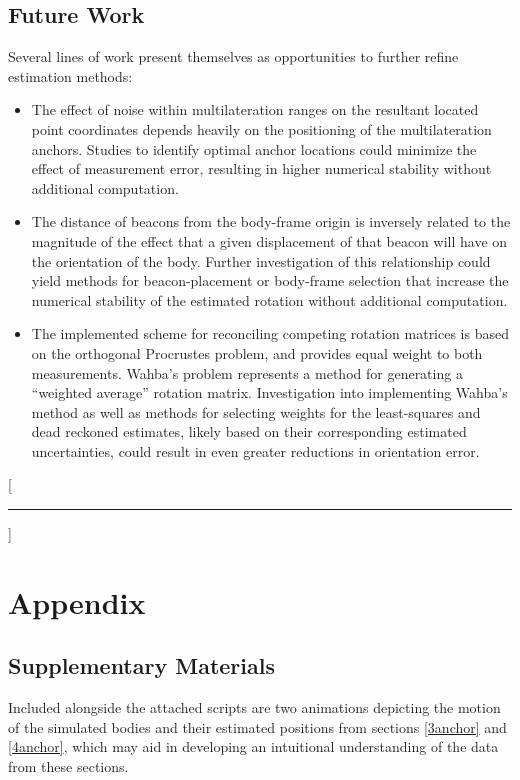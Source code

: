 \documentclass{report}
\begin{document}
		\section{Future Work}
			Several lines of work present themselves as opportunities to further refine estimation methods:
			\begin{itemize}[wide, labelwidth=!, labelindent=0pt, label={\bf\textendash}]
				\item The effect of noise within multilateration ranges on the resultant located point coordinates depends heavily on the positioning of the multilateration anchors. Studies to identify optimal anchor locations could minimize the effect of measurement error, resulting in higher numerical stability without additional computation.
				\item The distance of beacons from the body-frame origin is inversely related to the magnitude of the effect that a given displacement of that beacon will have on the orientation of the body. Further investigation of this relationship could yield methods for beacon-placement or body-frame selection that increase the numerical stability of the estimated rotation without additional computation.
				\item The implemented scheme for reconciling competing rotation matrices is based on the orthogonal Procrustes problem, and provides equal weight to both measurements. Wahba's problem represents a method for generating a ``weighted average'' rotation matrix. Investigation into implementing Wahba's method as well as methods for selecting weights for the least-squares and dead reckoned estimates, likely based on their corresponding estimated uncertainties, could result in even greater reductions in orientation error.\cite{Wahba}
			\end{itemize}

	\printbibliography
	
	\titleformat{\chapter}[display]{\bfseries\Huge}{}{0.0ex}{\vspace{-\baselineskip}}[\rule{\textwidth}{3pt}]
	
	\setcounter{chapter}{0}
	\renewcommand{\thechapter}{\Alph{chapter}}
	\chapter{Appendix}
		\section{Supplementary Materials}
			Included alongside the attached scripts are two animations depicting the motion of the simulated bodies and their estimated positions from sections \ref{3anchor} and \ref{4anchor}, which may aid in developing an intuitional understanding of the data from these sections.
\end{document}
